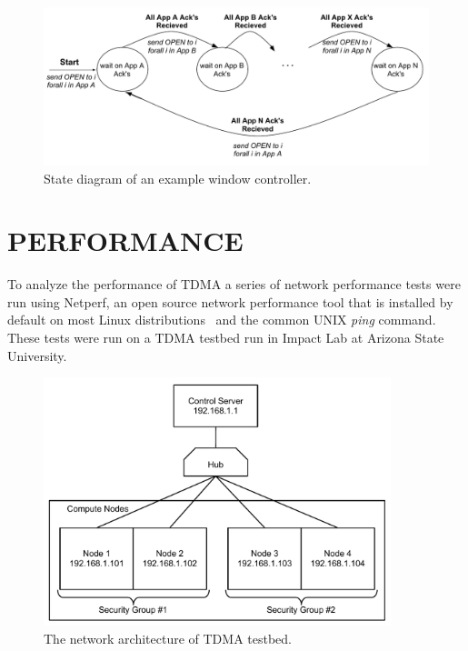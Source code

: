 \documentclass[oneside,12pt]{memoir}
\begin{document}
\begin{figure}
\centering
\includegraphics[scale=0.62]{control_state_diagram.pdf}
\caption{State diagram of an example window controller.}
\label{fig:control_state_diagram}
\end{figure}

\chapter{PERFORMANCE}
\label{chap:performance}
To analyze the performance of TDMA a series of network performance tests were run using Netperf, an open source network performance tool that is installed by default on most Linux distributions~\cite{netperf} and the common UNIX \textit{ping} command. These tests were run on a TDMA testbed run in Impact Lab at Arizona State University. 

\begin{figure}
  \begin{center}
    \includegraphics[width=0.9\textwidth]{tdm_demo_setup.pdf}
  \end{center}
  \caption{The network architecture of TDMA testbed.}
\label{fig:tdm_demo_setup}
\end{figure} 
\end{document}
